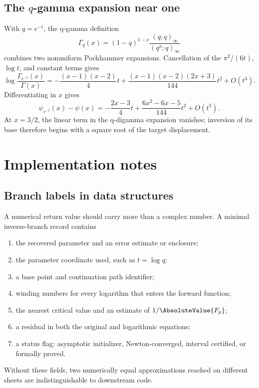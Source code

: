 \documentclass[11pt,letterpaper,oneside,openany]{book}
\theoremstyle{definition}
\theoremstyle{remark}
\begin{document}
\section{The \texorpdfstring{\(q\)}{q}-gamma expansion near one}
With \(q=e^{-t}\), the q-gamma definition
\[
 \Gamma_q(x)=(1-q)^{1-x}
 \frac{(q;q)_\infty}{(q^x;q)_\infty}
\]
combines two nonuniform Pochhammer expansions.  Cancellation of the
\(\pi^2/(6t)\), \(\log t\), and constant terms gives
\begin{equation}\label{eq:qgamma-one-appendix}
 \log\frac{\Gamma_{e^{-t}}(x)}{\Gamma(x)}
 =-\frac{(x-1)(x-2)}4t
 +\frac{(x-1)(x-2)(2x+3)}{144}t^2+O(t^3).
\end{equation}
Differentiating in \(x\) gives
\begin{equation}\label{eq:qdigamma-one-appendix}
 \psi_{e^{-t}}(x)-\psi(x)
 =-\frac{2x-3}{4}t
 +\frac{6x^2-6x-5}{144}t^2+O(t^3).
\end{equation}
At \(x=3/2\), the linear term in the q-digamma expansion vanishes; inversion
of its base therefore begins with a square root of the target displacement.

\chapter{Implementation notes}

\section{Branch labels in data structures}
A numerical return value should carry more than a complex number.  A minimal
inverse-branch record contains
\begin{enumerate}
\item the recovered parameter and an error estimate or enclosure;
\item the parameter coordinate used, such as \(t=\log q\);
\item a base point and continuation path identifier;
\item winding numbers for every logarithm that enters the forward function;
\item the nearest critical value and an estimate of \(1/\AbsoluteValue{F_p}\);
\item a residual in both the original and logarithmic equations;
\item a status flag: asymptotic initializer, Newton-converged, interval
certified, or formally proved.
\end{enumerate}
Without these fields, two numerically equal approximations reached on different
sheets are indistinguishable to downstream code.
\end{document}
